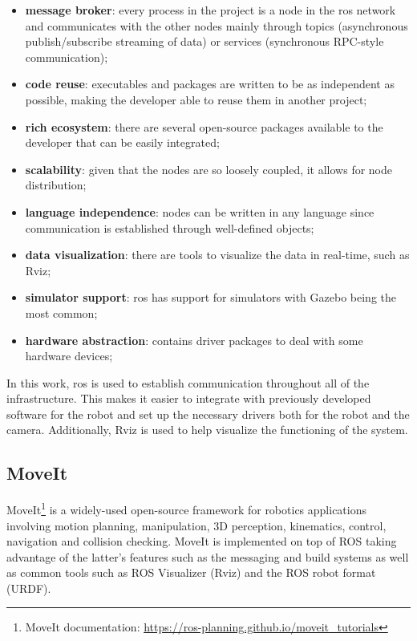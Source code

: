 \begin{itemize}
    \item \textbf{message broker}: every process in the project is a node in the \acs{ros} network and communicates with the other nodes mainly through topics (asynchronous publish/subscribe streaming of data) or services (synchronous RPC-style communication);
    \item \textbf{code reuse}: executables and packages are written to be as independent as possible, making the developer able to reuse them in another project;
    \item \textbf{rich ecosystem}: there are several open-source packages available to the developer that can be easily integrated;
    \item \textbf{scalability}: given that the nodes are so loosely coupled, it allows for node distribution;
    \item \textbf{language independence}: nodes can be written in any language since communication is established through well-defined objects;
    \item \textbf{data visualization}: there are tools to visualize the data in real-time, such as Rviz;
    \item \textbf{simulator support}: \acs{ros} has support for simulators with Gazebo being the most common;
    \item \textbf{hardware abstraction}: contains driver packages to deal with some hardware devices;
\end{itemize}

In this work, \acs{ros} is used to establish communication throughout all of the infrastructure. This makes it easier to integrate with previously developed software for the robot and set up the necessary drivers both for the robot and the camera. Additionally, Rviz is used to help visualize the functioning of the system.

\subsection{MoveIt}

MoveIt\footnote{MoveIt documentation: \url{https://ros-planning.github.io/moveit_tutorials}} is a widely-used open-source framework for robotics applications involving motion planning, manipulation, 3D perception, kinematics, control, navigation and collision checking. MoveIt is implemented on top of ROS taking advantage of the latter's features such as the messaging and build systems as well as common tools such as ROS Visualizer (Rviz) and the ROS robot format (URDF).

